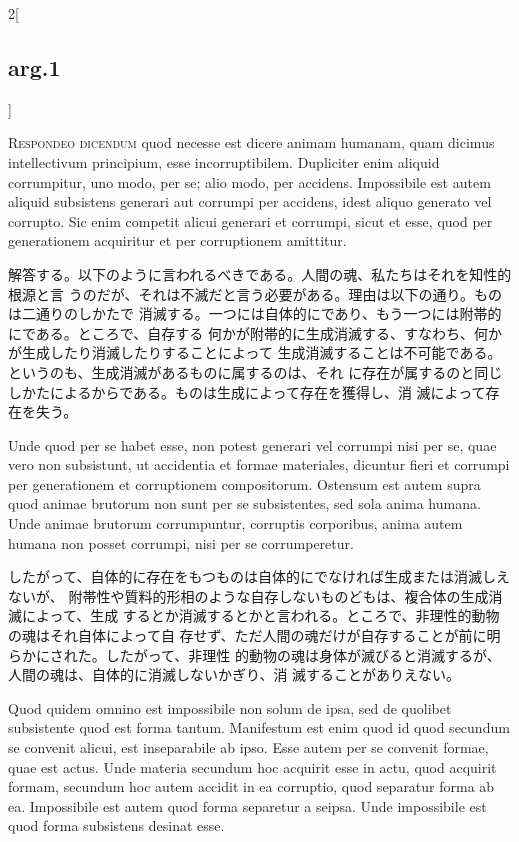 \documentclass[paper=a4paper,fontsize=10pt,jafontsize=9pt,titlepage]{jlreq}
\begin{document}
\begin{paracol}{2}[\subsection{arg.1}]

{\scshape Respondeo dicendum} quod necesse est dicere animam humanam, quam
dicimus intellectivum principium, esse incorruptibilem. Dupliciter enim aliquid
corrumpitur, uno modo, per se; alio modo, per accidens. Impossibile est autem
aliquid subsistens generari aut corrumpi per accidens, idest aliquo generato vel
corrupto. Sic enim competit alicui generari et corrumpi, sicut et esse, quod per
generationem acquiritur et per corruptionem amittitur.

\switchcolumn

解答する。以下のように言われるべきである。人間の魂、私たちはそれを知性的根源と言
うのだが、それは不滅だと言う必要がある。理由は以下の通り。ものは二通りのしかたで
消滅する。一つには自体的にであり、もう一つには附帯的にである。ところで、自存する
何かが附帯的に生成消滅する、すなわち、何かが生成したり消滅したりすることによって
生成消滅することは不可能である。というのも、生成消滅があるものに属するのは、それ
に存在が属するのと同じしかたによるからである。ものは生成によって存在を獲得し、消
滅によって存在を失う。

\switchcolumn*

Unde quod per se habet esse, non potest generari vel corrumpi nisi per se, quae
vero non subsistunt, ut accidentia et formae materiales, dicuntur fieri et
corrumpi per generationem et corruptionem compositorum. Ostensum est autem supra
quod animae brutorum non sunt per se subsistentes, sed sola anima humana. Unde
animae brutorum corrumpuntur, corruptis corporibus, anima autem humana non
posset corrumpi, nisi per se corrumperetur.

\switchcolumn

 したがって、自体的に存在をもつものは自体的にでなければ生成または消滅しえないが、
 附帯性や質料的形相のような自存しないものどもは、複合体の生成消滅によって、生成
 するとか消滅するとかと言われる。ところで、非理性的動物の魂はそれ自体によって自
 存せず、ただ人間の魂だけが自存することが前に明らかにされた。したがって、非理性
 的動物の魂は身体が滅びると消滅するが、人間の魂は、自体的に消滅しないかぎり、消
 滅することがありえない。


\switchcolumn*

Quod quidem omnino est impossibile non solum de ipsa, sed de quolibet
subsistente quod est forma tantum. Manifestum est enim quod id quod secundum se
convenit alicui, est inseparabile ab ipso. Esse autem per se convenit formae,
quae est actus. Unde materia secundum hoc acquirit esse in actu, quod acquirit
formam, secundum hoc autem accidit in ea corruptio, quod separatur forma ab
ea. Impossibile est autem quod forma separetur a seipsa. Unde impossibile est
quod forma subsistens desinat esse.


\end{paracol}
\end{document}
